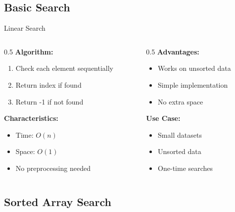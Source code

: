\documentclass[aspectratio=169,xcolor=dvipsnames]{beamer}
\begin{document}
\subsection{Basic Search}

\begin{frame}{Linear Search}
  \begin{columns}
    \begin{column}{0.5\textwidth}
      \textbf{Algorithm:}
      \begin{enumerate}
        \item Check each element sequentially
        \item Return index if found
        \item Return -1 if not found
      \end{enumerate}

      \vspace{0.3cm}
      \textbf{Characteristics:}
      \begin{itemize}
        \item Time: $O(n)$
        \item Space: $O(1)$
        \item No preprocessing needed
      \end{itemize}
    \end{column}

    \begin{column}{0.5\textwidth}
      \textbf{Advantages:}
      \begin{itemize}
        \item Works on unsorted data
        \item Simple implementation
        \item No extra space
      \end{itemize}

      \vspace{0.3cm}
      \textbf{Use Case:}
      \begin{itemize}
        \item Small datasets
        \item Unsorted data
        \item One-time searches
      \end{itemize}
    \end{column}
  \end{columns}
\end{frame}

\subsection{Sorted Array Search}
\end{document}
